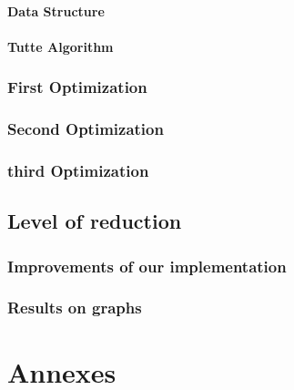 \documentclass[12pt]{report}
\begin{document}
\subsection{Data Structure}



\subsection{Tutte Algorithm}

\section{First Optimization}

\section{Second Optimization}

\section{third Optimization}

\chapter{Level of reduction}

\section{Improvements of our implementation}
\section{Results on graphs}





\part{Annexes}
\appendix

\end{document}
